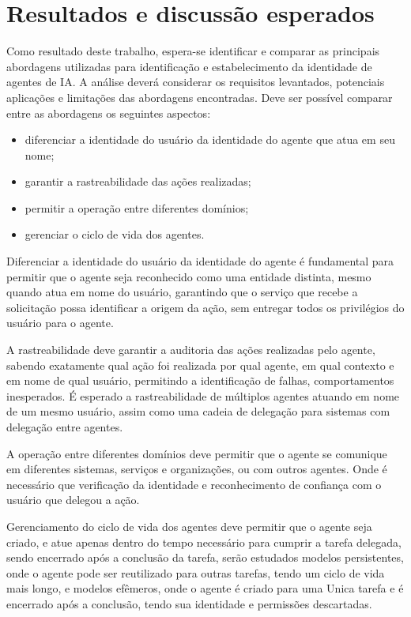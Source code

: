 \documentclass[11pt]{../../modelos-latex/classes/ifscarticle}
\begin{document}
\section{Resultados e discussão esperados}

Como resultado deste trabalho, espera-se identificar e comparar as principais abordagens utilizadas para identificação e estabelecimento da identidade de agentes de IA. A análise deverá considerar os requisitos levantados, potenciais aplicações e limitações das abordagens encontradas. Deve ser possível comparar entre as abordagens os seguintes aspectos:
\begin{itemize}
	\item diferenciar a identidade do usuário da identidade do agente que atua em seu nome;
	\item garantir a rastreabilidade das ações realizadas;
	\item permitir a operação entre diferentes domínios;
	\item gerenciar o ciclo de vida dos agentes.
\end{itemize}

Diferenciar a identidade do usuário da identidade do agente é fundamental para permitir que o agente seja reconhecido como uma entidade distinta, mesmo quando atua em nome do usuário, garantindo que o serviço que recebe a solicitação possa identificar a origem da ação, sem entregar todos os privilégios do usuário para o agente.

A rastreabilidade deve garantir a auditoria das ações realizadas pelo agente, sabendo exatamente qual ação foi realizada por qual agente, em qual contexto e em nome de qual usuário, permitindo a identificação de falhas, comportamentos inesperados. É esperado a rastreabilidade de múltiplos agentes atuando em nome de um mesmo usuário, assim como uma cadeia de delegação para sistemas com delegação entre agentes.

A operação entre diferentes domínios deve permitir que o agente se comunique em diferentes sistemas, serviços e organizações, ou com outros agentes. Onde é necessário que verificação da identidade e reconhecimento de confiança com o usuário que delegou a ação.

Gerenciamento do ciclo de vida dos agentes deve permitir que o agente seja criado, e atue apenas dentro do tempo necessário para cumprir a tarefa delegada, sendo encerrado após a conclusão da tarefa, serão estudados modelos persistentes, onde o agente pode ser reutilizado para outras tarefas, tendo um ciclo de vida mais longo, e modelos efêmeros, onde o agente é criado para uma Unica tarefa e é encerrado após a conclusão, tendo sua identidade e permissões descartadas.
\end{document}
